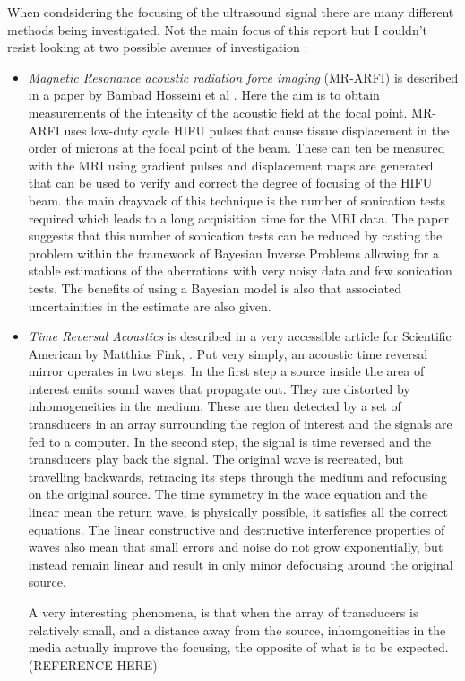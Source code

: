 \documentclass[11pt]{article} %
\begin{document}
	When condsidering the focusing of the ultrasound signal there are many different methods being investigated. Not the main focus of this report but I couldn't resist looking at two possible avenues of investigation : 
	\begin{itemize}
		\item  \textit{Magnetic Resonance acoustic radiation force imaging} (MR-ARFI) is described in a paper by Bambad Hosseini et al	\cite{Hosseini2018}. Here the aim is to obtain measurements of the intensity of the acoustic field at the focal point. MR-ARFI uses low-duty cycle HIFU pulses that cause tissue displacement in the order of microns at the focal point of the beam. These can ten be measured with the MRI using gradient pulses and displacement maps are generated that can be used to verify and correct the degree of focusing of the HIFU beam. the main drayvack of this technique is the number of sonication tests required which leads to a long acquisition time for the MRI data. The paper suggests that this number of sonication tests can be reduced by casting the problem within the framework of Bayesian Inverse Problems allowing for a stable estimations of the aberrations with very noisy data and few sonication tests. The benefits of using a Bayesian model is also that associated uncertainities in the estimate are also given.
		\item \textit{Time Reversal Acoustics} is described in a very accessible article for Scientific American by Matthias Fink, \cite{Fink1999}. Put very simply, an acoustic time reversal mirror operates in two steps. In the first step a source inside the area of interest emits sound waves that propagate out. They are distorted by inhomogeneities in the medium. These are then detected by a set of transducers in an array surrounding the region of interest and the signals are fed to a computer. In the second step, the signal is time reversed and the transducers play back the signal. The original wave is recreated, but travelling backwards, retracing its steps through the medium and refocusing on the original source.  The time symmetry in the wace equation and the linear mean the return wave, is physically possible, it satisfies all the correct equations. The linear constructive and destructive interference properties of waves also mean that small errors and noise do not grow exponentially, but instead remain linear and result in only minor defocusing around the original source.
		
		A very interesting phenomena, is that when the array of transducers is relatively small, and a distance away from the source, inhomgoneities in the media actually improve the focusing, the opposite of what is to be expected. (REFERENCE HERE)
		

\end{itemize}
\end{document}
